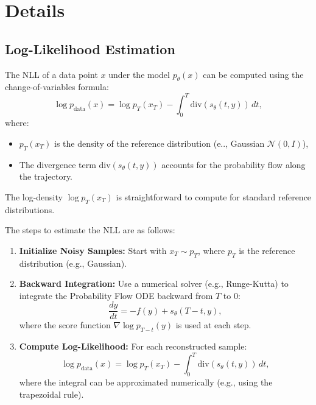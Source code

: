 \documentclass[a4paper,14pt]{article}
\theoremstyle{plain} %
\theoremstyle{definition} %
\theoremstyle{remark} %
\theoremstyle{definition}
\theoremstyle{remark}
\theoremstyle{remark}
\begin{document}
	\section{Details}
	
	\subsection{Log-Likelihood Estimation}
	
	The NLL of a data point \( x \) under the model \( p_\theta(x) \) can be computed using the change-of-variables formula:
	\[
	\log p_{\text{data}}(x) = \log p_T(x_T) - \int_0^T \text{div}(s_\theta(t, y)) \, dt,
	\]
	where:
	\begin{itemize}
		\item \( p_T(x_T) \) is the density of the reference distribution (e.., Gaussian \( \mathcal{N}(0, I) \)),
		\item The divergence term \( \text{div}(s_\theta(t, y)) \) accounts for the probability flow along the trajectory.
	\end{itemize}
	
	The log-density \( \log p_T(x_T) \) is straightforward to compute for standard reference distributions.
	
	
	The steps to estimate the NLL are as follows:
	\begin{enumerate}
		\item \textbf{Initialize Noisy Samples:} Start with \( x_T \sim p_T \), where \( p_T \) is the reference distribution (e.g., Gaussian).
		\item \textbf{Backward Integration:} Use a numerical solver (e.g., Runge-Kutta) to integrate the Probability Flow ODE backward from \( T \) to 0:
		\[
		\frac{dy}{dt} = -f(y) + s_\theta(T - t, y),
		\]
		where the score function \( \nabla \log p_{T-t}(y) \) is used at each step.
		\item \textbf{Compute Log-Likelihood:} For each reconstructed sample:
		\[
		\log p_{\text{data}}(x) = \log p_T(x_T) - \int_0^T \text{div}(s_\theta(t, y)) \, dt,
		\]
		where the integral can be approximated numerically (e.g., using the trapezoidal rule).
	\end{enumerate}
	
	\nocite{*}
	\printbibliography
	
\end{document}
